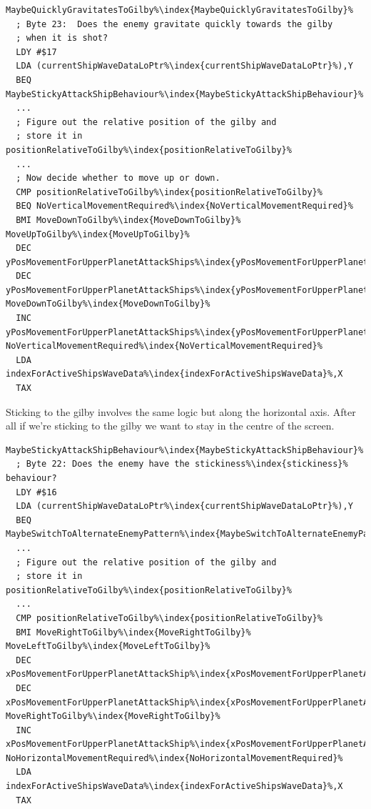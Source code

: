 \begin{lstlisting}[escapechar=\%]
MaybeQuicklyGravitatesToGilby%\index{MaybeQuicklyGravitatesToGilby}%
  ; Byte 23:  Does the enemy gravitate quickly towards the gilby
  ; when it is shot?
  LDY #$17
  LDA (currentShipWaveDataLoPtr%\index{currentShipWaveDataLoPtr}%),Y
  BEQ MaybeStickyAttackShipBehaviour%\index{MaybeStickyAttackShipBehaviour}%
  ...
  ; Figure out the relative position of the gilby and
  ; store it in positionRelativeToGilby%\index{positionRelativeToGilby}%
  ...
  ; Now decide whether to move up or down.
  CMP positionRelativeToGilby%\index{positionRelativeToGilby}%
  BEQ NoVerticalMovementRequired%\index{NoVerticalMovementRequired}%
  BMI MoveDownToGilby%\index{MoveDownToGilby}%
MoveUpToGilby%\index{MoveUpToGilby}%
  DEC yPosMovementForUpperPlanetAttackShips%\index{yPosMovementForUpperPlanetAttackShips}%,X
  DEC yPosMovementForUpperPlanetAttackShips%\index{yPosMovementForUpperPlanetAttackShips}%,X
MoveDownToGilby%\index{MoveDownToGilby}%
  INC yPosMovementForUpperPlanetAttackShips%\index{yPosMovementForUpperPlanetAttackShips}%,X
NoVerticalMovementRequired%\index{NoVerticalMovementRequired}%
  LDA indexForActiveShipsWaveData%\index{indexForActiveShipsWaveData}%,X
  TAX
\end{lstlisting}

Sticking to the gilby involves the same logic but along the horizontal axis. After all if we're sticking to the gilby
we want to stay in the centre of the screen.

\begin{lstlisting}[escapechar=\%]
MaybeStickyAttackShipBehaviour%\index{MaybeStickyAttackShipBehaviour}%   
  ; Byte 22: Does the enemy have the stickiness%\index{stickiness}% behaviour?
  LDY #$16
  LDA (currentShipWaveDataLoPtr%\index{currentShipWaveDataLoPtr}%),Y
  BEQ MaybeSwitchToAlternateEnemyPattern%\index{MaybeSwitchToAlternateEnemyPattern}%
  ...
  ; Figure out the relative position of the gilby and
  ; store it in positionRelativeToGilby%\index{positionRelativeToGilby}%
  ...
  CMP positionRelativeToGilby%\index{positionRelativeToGilby}%
  BMI MoveRightToGilby%\index{MoveRightToGilby}%
MoveLeftToGilby%\index{MoveLeftToGilby}%   
  DEC xPosMovementForUpperPlanetAttackShip%\index{xPosMovementForUpperPlanetAttackShip}%,X
  DEC xPosMovementForUpperPlanetAttackShip%\index{xPosMovementForUpperPlanetAttackShip}%,X
MoveRightToGilby%\index{MoveRightToGilby}%   
  INC xPosMovementForUpperPlanetAttackShip%\index{xPosMovementForUpperPlanetAttackShip}%,X
NoHorizontalMovementRequired%\index{NoHorizontalMovementRequired}%   
  LDA indexForActiveShipsWaveData%\index{indexForActiveShipsWaveData}%,X
  TAX
\end{lstlisting}

